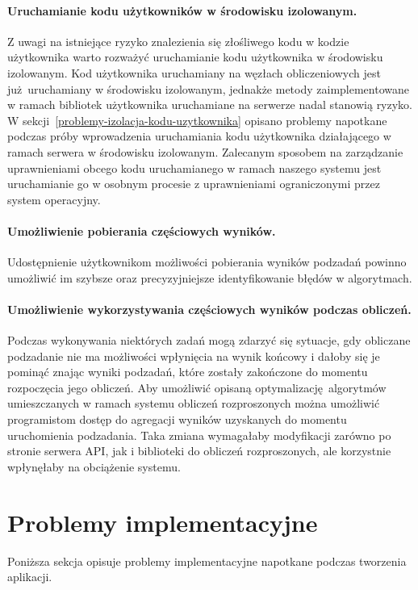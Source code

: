\documentclass[a4paper,11pt,twoside]{report}
\theoremstyle{definition}
\begin{document}
        \paragraph{Uruchamianie kodu użytkowników w środowisku izolowanym.}
        \label{uruchamianie-w-srodowisku-izolowanym}
        Z uwagi na istniejące ryzyko znalezienia się złośliwego kodu w kodzie użytkownika warto rozważyć uruchamianie kodu użytkownika w środowisku izolowanym. Kod użytkownika uruchamiany na węzłach obliczeniowych jest już uruchamiany w środowisku izolowanym, jednakże metody zaimplementowane w ramach bibliotek użytkownika uruchamiane na serwerze nadal stanowią ryzyko.
        W sekcji~\ref{problemy-izolacja-kodu-uzytkownika}
        opisano problemy napotkane podczas próby wprowadzenia uruchamiania kodu użytkownika działającego w ramach serwera w środowisku izolowanym. 
        Zalecanym sposobem na zarządzanie uprawnieniami obcego kodu uruchamianego w ramach naszego systemu jest uruchamianie go w osobnym procesie z uprawnieniami ograniczonymi przez system operacyjny.
        
        \paragraph{Umożliwienie pobierania częściowych wyników.}
        Udostępnienie użytkownikom możliwości pobierania wyników podzadań powinno umożliwić im szybsze oraz precyzyjniejsze identyfikowanie błędów w algorytmach.

        \paragraph{Umożliwienie wykorzystywania częściowych wyników podczas obliczeń.}
        Podczas wykonywania niektórych zadań mogą zdarzyć się sytuacje, gdy obliczane podzadanie nie ma możliwości wpłynięcia na wynik końcowy i dałoby się je pominąć znając wyniki podzadań, które zostały zakończone do momentu rozpoczęcia jego obliczeń.
        Aby umożliwić opisaną optymalizację algorytmów umieszczanych w ramach systemu obliczeń rozproszonych można umożliwić programistom dostęp do agregacji wyników uzyskanych do momentu uruchomienia podzadania.
        Taka zmiana wymagałaby modyfikacji zarówno po stronie serwera API, jak i biblioteki do obliczeń rozproszonych, ale korzystnie wpłynęłaby na obciążenie systemu.
        
    \section{Problemy implementacyjne}
        \label{problemy-implementacyjne}
        Poniższa sekcja opisuje problemy implementacyjne napotkane podczas tworzenia aplikacji.
        
\end{document}
